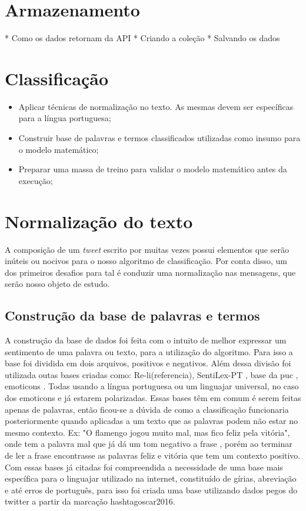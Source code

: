 \section{Armazenamento}
* Como os dados retornam da API
* Criando a coleção
* Salvando os dados


\section{Classificação}
\begin{itemize}
	\item Aplicar técnicas de normalização no texto. As mesmas devem ser específicas para a língua portuguesa;
	\item Construir base de palavras e termos classificados utilizadas como insumo para o modelo matemático;
	\item Preparar uma massa de treino para validar o modelo matemático antes da execução;
\end{itemize}

\section{Normalização do texto}

A composição de um \textit{tweet} escrito por muitas vezes possui elementos que serão inúteis ou nocivos para o nosso algoritmo de classificação. Por conta disso, um dos primeiros desafios para tal é conduzir uma normalização nas mensagens, que serão nosso objeto de estudo.


\subsection{Construção da base de palavras e termos}
A construção da base de dados foi feita com o intuito de melhor expressar um sentimento de uma palavra ou texto, para a utilização do algoritmo. Para isso a base foi dividida em dois arquivos, positivos e negativos. Além dessa divisão foi utilizada outas bases criadas como: Re-li(referencia), SentiLex-PT \cite{marioj.silvapaulacarvalholuissarmento2012}, base da puc \cite{freitas2013construccao}, emoticons \cite{alexanderhogenboomdaniellabalflaviusfrasincarmalissabalfranciskadejonguzaykaymak}. Todas usando a língua portuguesa ou um linguajar universal, no caso dos emoticons e já estarem polarizadas. Essas bases têm em comum é serem feitas apenas de palavras, então ficou-se a dúvida de como a classificação funcionaria posteriormente quando aplicadas a um texto que as palavras podem não estar no mesmo contexto. Ex: "O flamengo jogou muito mal, mas fico feliz pela vitória", onde tem a palavra mal que já dá um tom negativo a frase , porém ao terminar de ler a frase encontrasse as palavras feliz e vitória que tem um contexto positivo.
Com essas bases já citadas foi compreendida a necessidade de uma base mais específica para o linguajar utilizado na internet, constituído de  
gírias, abreviação e até erros de português, para isso foi criada uma base utilizando dados pegos do twitter a partir da marcação hashtagoscar2016.



